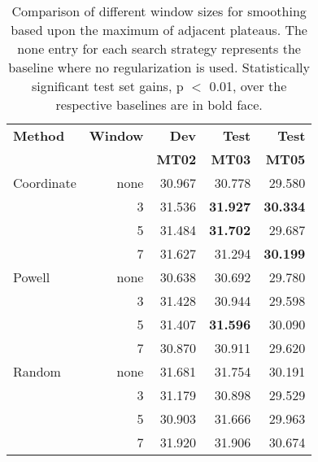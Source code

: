 \documentclass[11pt]{article}
\begin{document}
\begin{table}
\begin{center}
\begin{tabular}{|l|rrrr|}
\hline \bf Method  & \bf Window & \bf Dev & \bf Test & \bf Test \\
                   &            & \bf MT02 & \bf MT03 & \bf MT05 \\ \hline
Coordinate & none &  30.967 & 30.778 & 29.580 \\
           & 3  & 31.536  & {\bf 31.927} & {\bf 30.334} \\
           & 5  & 31.484   & {\bf 31.702}  &  29.687  \\
           & 7  & 31.627 &  31.294 & {\bf 30.199} \\ \hline
Powell     & none & 30.638 & 30.692 & 29.780 \\
           & 3  & 31.428  & 30.944  & 29.598 \\
           & 5  & 31.407  & {\bf 31.596} & 30.090  \\
           & 7  & 30.870  & 30.911 & 29.620  \\ \hline
Random     & none & 31.681 & 31.754 & 30.191 \\
           & 3  & 31.179 & 30.898 & 29.529 \\
           & 5  & 30.903 & 31.666 & 29.963 \\
           & 7  & 31.920 & 31.906 & 30.674 \\
\hline
\end{tabular}
\end{center}
\caption{
\label{minsmoothing}
Comparison of different window sizes for smoothing based upon the maximum of adjacent plateaus. 
The none entry for each search strategy represents the baseline where no regularization is used. Statistically significant test set gains, p $<$ 0.01, over the respective baselines are in bold face. 
}
\end{table}


\end{document}
